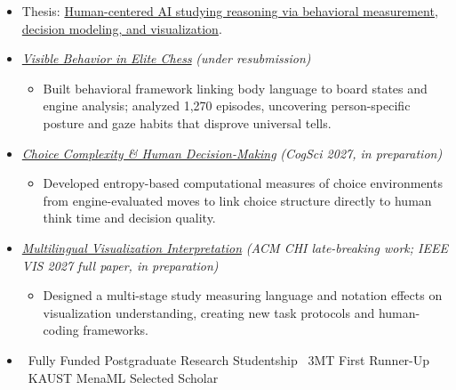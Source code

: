 \documentclass[letterpaper,10pt]{article}
\newcommand{\resumelink}[2]{\href{#1}{\textcolor{accent}{#2}}}
\begin{document}
  \begin{itemize}[leftmargin=0.15in, label=\raisebox{0.2ex}{\tiny$\bullet$}, itemsep=2.5pt, topsep=2pt, parsep=0pt]
    \item Thesis: \resumelink{https://ema-ans.github.io/projects/no-single-tell.html}{Human-centered AI studying reasoning via behavioral measurement, decision modeling, and visualization}.
    
    \item \textit{\resumelink{https://ema-ans.github.io/projects/no-single-tell.html}{Visible Behavior in Elite Chess}} \hfill \textcolor{accent}{\textit{(under resubmission)}}
      \begin{itemize}[leftmargin=0.12in, label=\raisebox{0.1ex}{\tiny$\circ$}, itemsep=1pt, topsep=1pt]
        \item Built behavioral framework linking body language to board states and engine analysis; analyzed 1,270 episodes, uncovering person-specific posture and gaze habits that disprove universal tells.
      \end{itemize}

    \item \textit{\resumelink{https://ema-ans.github.io/projects/choice-complexity.html}{Choice Complexity \& Human Decision-Making}} \hfill \textcolor{accent}{\textit{(CogSci 2027, in preparation)}}
      \begin{itemize}[leftmargin=0.12in, label=\raisebox{0.1ex}{\tiny$\circ$}, itemsep=1pt, topsep=1pt]
        \item Developed entropy-based computational measures of choice environments from engine-evaluated moves to link choice structure directly to human think time and decision quality.
      \end{itemize}

    \item \textit{\resumelink{https://ema-ans.github.io/projects/multilingual-visualization.html}{Multilingual Visualization Interpretation}} \hfill \textcolor{accent}{\textit{(ACM CHI late-breaking work; IEEE VIS 2027 full paper, in preparation)}}
      \begin{itemize}[leftmargin=0.12in, label=\raisebox{0.1ex}{\tiny$\circ$}, itemsep=1pt, topsep=1pt]
        \item Designed a multi-stage study measuring language and notation effects on visualization understanding, creating new task protocols and human-coding frameworks.
      \end{itemize}

    \item \textcolor{accent}{\faAward}~Fully Funded Postgraduate Research Studentship \quad
          \textcolor{accent}{\faAward}~3MT First Runner-Up \quad
          \textcolor{accent}{\faAward}~KAUST MenaML Selected Scholar
  \end{itemize}
\end{document}
